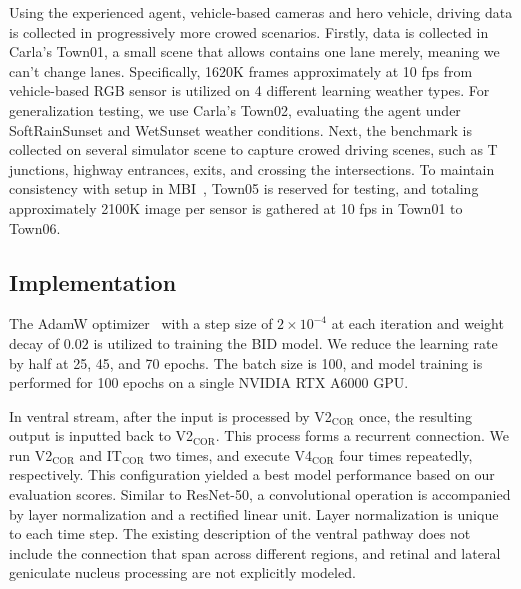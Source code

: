 Using the experienced agent, vehicle-based cameras and hero vehicle, driving data is collected in progressively more crowed scenarios.
Firstly, data is collected in Carla's Town01, a small scene that allows contains one lane merely, meaning we can't change lanes.
Specifically, 1620K frames approximately at 10 fps from vehicle-based RGB sensor is utilized on 4 different learning weather types.
For generalization testing, we use Carla's Town02, evaluating the agent under SoftRainSunset and WetSunset weather conditions. 
Next, the benchmark is collected on several simulator scene to capture crowed driving scenes, such as T junctions, highway entrances, exits, and crossing the intersections. 
To maintain consistency with setup in MBI~\cite{Hu:2022}, Town05 is reserved for testing, and totaling approximately 2100K image per sensor is gathered at 10 fps in Town01 to Town06. 



\subsection{Implementation}

\hspace{1pc}The AdamW optimizer~\cite{loshchilov2017decoupled} with a step size of $2 \times 10^{-4}$ at each iteration and weight decay of $0.02$ is utilized to training the BID model. 
We reduce the learning rate by half at 25, 45, and 70 epochs.
The batch size is 100, 
and model training is performed for 100 epochs on a single NVIDIA RTX A6000 GPU.


In ventral stream, after the input is processed by V2$_\text{COR}$ once, the resulting output is inputted back to V2$_\text{COR}$.
This process forms a recurrent connection.
We run V2$_\text{COR}$ and IT$_\text{COR}$ two times, and execute V4$_\text{COR}$ four times repeatedly, respectively.
This configuration yielded a best model performance based on our evaluation scores.
Similar to ResNet-50, a convolutional operation is accompanied by layer normalization and a rectified linear unit.
Layer normalization is unique to each time step.
The existing description of the ventral pathway does not include the connection that span across different regions, and retinal and lateral geniculate nucleus processing are not explicitly modeled.


